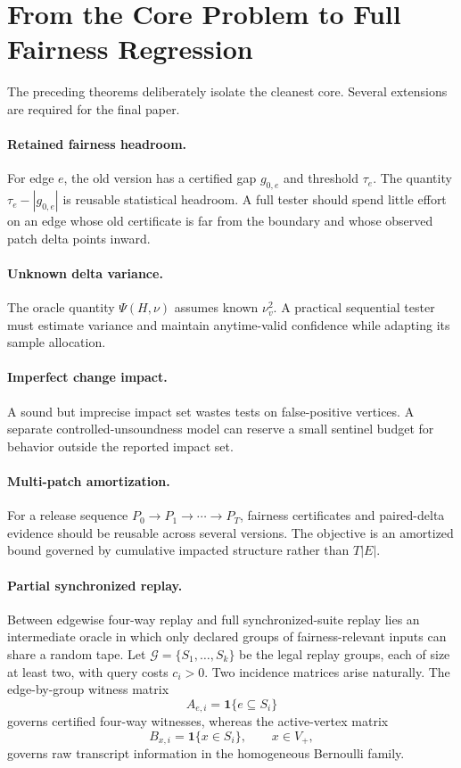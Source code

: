 \section{From the Core Problem to Full Fairness Regression}
\label{sec:open}

The preceding theorems deliberately isolate the cleanest core.  Several extensions
are required for the final paper.

\paragraph{Retained fairness headroom.}
For edge $e$, the old version has a certified gap $g_{0,e}$ and threshold $\tau_e$.
The quantity $\tau_e-|g_{0,e}|$ is reusable statistical headroom.  A full tester
should spend little effort on an edge whose old certificate is far from the
boundary and whose observed patch delta points inward.

\paragraph{Unknown delta variance.}
The oracle quantity $\Psi(H,\nu)$ assumes known $\nu_v^2$.  A practical sequential
tester must estimate variance and maintain anytime-valid confidence while adapting
its sample allocation.

\paragraph{Imperfect change impact.}
A sound but imprecise impact set wastes tests on false-positive vertices.  A
separate controlled-unsoundness model can reserve a small sentinel budget for
behavior outside the reported impact set.

\paragraph{Multi-patch amortization.}
For a release sequence $P_0\to P_1\to\cdots\to P_T$, fairness certificates and
paired-delta evidence should be reusable across several versions.  The objective
is an amortized bound governed by cumulative impacted structure rather than
$T|E|$.

\paragraph{Partial synchronized replay.}
Between edgewise four-way replay and full synchronized-suite replay lies an
intermediate oracle in which only declared groups of fairness-relevant inputs can
share a random tape.  Let $\mathcal G=\{S_1,\ldots,S_k\}$ be the legal replay
groups, each of size at least two, with query costs $c_i>0$.  Two incidence
matrices arise naturally.  The edge-by-group witness matrix
\[
A_{e,i}=\mathbf{1}\{e\subseteq S_i\}
\]
governs certified four-way witnesses, whereas the active-vertex matrix
\[
B_{x,i}=\mathbf{1}\{x\in S_i\},
\qquad x\in V_+,
\]
governs raw transcript information in the homogeneous Bernoulli family.

